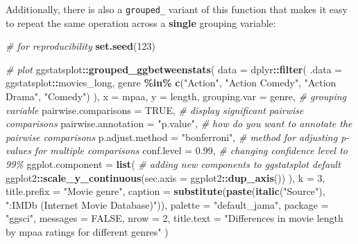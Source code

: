 \documentclass[
]{article}
\newenvironment{Shaded}{\begin{snugshade}}{\end{snugshade}}
\newcommand{\CommentTok}[1]{\textcolor[rgb]{0.56,0.35,0.01}{\textit{#1}}}
\newcommand{\DataTypeTok}[1]{\textcolor[rgb]{0.13,0.29,0.53}{#1}}
\newcommand{\DecValTok}[1]{\textcolor[rgb]{0.00,0.00,0.81}{#1}}
\newcommand{\FloatTok}[1]{\textcolor[rgb]{0.00,0.00,0.81}{#1}}
\newcommand{\KeywordTok}[1]{\textcolor[rgb]{0.13,0.29,0.53}{\textbf{#1}}}
\newcommand{\NormalTok}[1]{#1}
\newcommand{\OperatorTok}[1]{\textcolor[rgb]{0.81,0.36,0.00}{\textbf{#1}}}
\newcommand{\OtherTok}[1]{\textcolor[rgb]{0.56,0.35,0.01}{#1}}
\newcommand{\StringTok}[1]{\textcolor[rgb]{0.31,0.60,0.02}{#1}}
\begin{document}
Additionally, there is also a \texttt{grouped\_} variant of this function that makes it
easy to repeat the same operation across a \textbf{single} grouping variable:

\begin{Shaded}
\begin{Highlighting}[]
\CommentTok{\# for reproducibility}
\KeywordTok{set.seed}\NormalTok{(}\DecValTok{123}\NormalTok{)}

\CommentTok{\# plot}
\NormalTok{ggstatsplot}\OperatorTok{::}\KeywordTok{grouped\_ggbetweenstats}\NormalTok{(}
  \DataTypeTok{data =}\NormalTok{ dplyr}\OperatorTok{::}\KeywordTok{filter}\NormalTok{(}
    \DataTypeTok{.data =}\NormalTok{ ggstatsplot}\OperatorTok{::}\NormalTok{movies\_long,}
\NormalTok{    genre }\OperatorTok{\%in\%}\StringTok{ }\KeywordTok{c}\NormalTok{(}\StringTok{"Action"}\NormalTok{, }\StringTok{"Action Comedy"}\NormalTok{, }\StringTok{"Action Drama"}\NormalTok{, }\StringTok{"Comedy"}\NormalTok{)}
\NormalTok{  ),}
  \DataTypeTok{x =}\NormalTok{ mpaa,}
  \DataTypeTok{y =}\NormalTok{ length,}
  \DataTypeTok{grouping.var =}\NormalTok{ genre, }\CommentTok{\# grouping variable}
  \DataTypeTok{pairwise.comparisons =} \OtherTok{TRUE}\NormalTok{, }\CommentTok{\# display significant pairwise comparisons}
  \DataTypeTok{pairwise.annotation =} \StringTok{"p.value"}\NormalTok{, }\CommentTok{\# how do you want to annotate the pairwise comparisons}
  \DataTypeTok{p.adjust.method =} \StringTok{"bonferroni"}\NormalTok{, }\CommentTok{\# method for adjusting p{-}values for multiple comparisons}
  \DataTypeTok{conf.level =} \FloatTok{0.99}\NormalTok{, }\CommentTok{\# changing confidence level to 99\%}
  \DataTypeTok{ggplot.component =} \KeywordTok{list}\NormalTok{( }\CommentTok{\# adding new components to \textasciigrave{}ggstatsplot\textasciigrave{} default}
\NormalTok{    ggplot2}\OperatorTok{::}\KeywordTok{scale\_y\_continuous}\NormalTok{(}\DataTypeTok{sec.axis =}\NormalTok{ ggplot2}\OperatorTok{::}\KeywordTok{dup\_axis}\NormalTok{())}
\NormalTok{  ),}
  \DataTypeTok{k =} \DecValTok{3}\NormalTok{,}
  \DataTypeTok{title.prefix =} \StringTok{"Movie genre"}\NormalTok{,}
  \DataTypeTok{caption =} \KeywordTok{substitute}\NormalTok{(}\KeywordTok{paste}\NormalTok{(}\KeywordTok{italic}\NormalTok{(}\StringTok{"Source"}\NormalTok{), }\StringTok{":IMDb (Internet Movie Database)"}\NormalTok{)),}
  \DataTypeTok{palette =} \StringTok{"default\_jama"}\NormalTok{,}
  \DataTypeTok{package =} \StringTok{"ggsci"}\NormalTok{,}
  \DataTypeTok{messages =} \OtherTok{FALSE}\NormalTok{,}
  \DataTypeTok{nrow =} \DecValTok{2}\NormalTok{,}
  \DataTypeTok{title.text =} \StringTok{"Differences in movie length by mpaa ratings for different genres"}
\NormalTok{)}
\end{Highlighting}
\end{Shaded}
\end{document}
